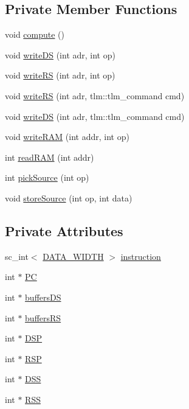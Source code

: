 \subsection*{Private Member Functions}
\begin{DoxyCompactItemize}
\item 
void \hyperlink{classAlu_a3fabfe3b33df17581f8bc85de9eddeea}{compute} ()
\item 
void \hyperlink{classAlu_adf5731c0d59b22371ad9403afaaacff4}{write\+D\+S} (int adr, int op)
\item 
void \hyperlink{classAlu_a5ae5ca371b090c716236619f2d63fd74}{write\+R\+S} (int adr, int op)
\item 
void \hyperlink{classAlu_a2ab3afd02491a49f20c141c694c2ecbe}{write\+R\+S} (int adr, tlm\+::tlm\+\_\+command cmd)
\item 
void \hyperlink{classAlu_ad82f3646bf0843beabf5d0ee18d6e273}{write\+D\+S} (int adr, tlm\+::tlm\+\_\+command cmd)
\item 
void \hyperlink{classAlu_aee7f8876c2ebe00f52e3bb55d8f86b73}{write\+R\+A\+M} (int addr, int op)
\item 
int \hyperlink{classAlu_a059b74a69d274885568cfbb2e31fc603}{read\+R\+A\+M} (int addr)
\item 
int \hyperlink{classAlu_a05a5eb6c972a875195498e91f5418706}{pick\+Source} (int op)
\item 
void \hyperlink{classAlu_a39455b035f0298a546de937f9ab21426}{store\+Source} (int op, int data)
\end{DoxyCompactItemize}
\subsection*{Private Attributes}
\begin{DoxyCompactItemize}
\item 
sc\+\_\+int$<$ \hyperlink{Defines_8h_af087b76f9707be9d3b43ba0c782c31c3}{D\+A\+T\+A\+\_\+\+W\+I\+D\+T\+H} $>$ \hyperlink{classAlu_a307709e37d80c03970b0165d29dfb4c4}{instruction}
\item 
int $\ast$ \hyperlink{classAlu_afc87096d954e9091302d7c1854a910e1}{P\+C}
\item 
int $\ast$ \hyperlink{classAlu_a259ee7ef49be47158d26c8c3a0ae1feb}{buffers\+D\+S}
\item 
int $\ast$ \hyperlink{classAlu_a4b54db20f10aed5d7d70378b5c9a77fd}{buffers\+R\+S}
\item 
int $\ast$ \hyperlink{classAlu_aea20506a48d2027cd27a0c2aec32a4c7}{D\+S\+P}
\item 
int $\ast$ \hyperlink{classAlu_ad6e5dacce0eecd38c727b6cc5877d05c}{R\+S\+P}
\item 
int $\ast$ \hyperlink{classAlu_ab0be93bc681fe3791cbd8a815d018a89}{D\+S\+S}
\item 
int $\ast$ \hyperlink{classAlu_abd81e60239f46572212450b326f2261d}{R\+S\+S}
\end{DoxyCompactItemize}


